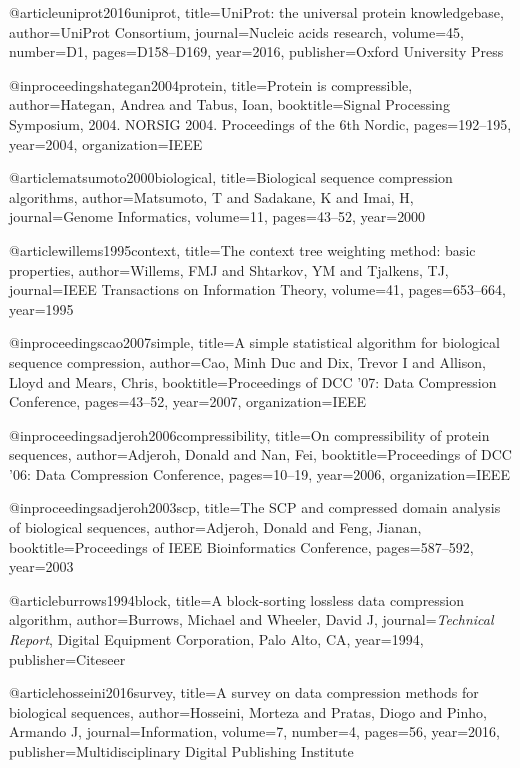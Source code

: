 @article{uniprot2016uniprot,
  title={{UniProt}: the universal protein knowledgebase},
  author={UniProt Consortium},
  journal={Nucleic acids research},
  volume={45},
  number={D1},
  pages={D158--D169},
  year={2016},
  publisher={Oxford University Press}
}

@inproceedings{hategan2004protein,
  title={Protein is compressible},
  author={Hategan, Andrea and Tabus, Ioan},
  booktitle={Signal Processing Symposium, 2004. NORSIG 2004. Proceedings of the 6th Nordic},
  pages={192--195},
  year={2004},
  organization={IEEE}
}

@article{matsumoto2000biological,
  title={Biological sequence compression algorithms},
  author={Matsumoto, T and Sadakane, K and Imai, H},
  journal={Genome Informatics},
  volume={11},
  pages={43--52},
  year={2000}
}

@article{willems1995context,
  title={The context tree weighting method: basic properties},
  author={Willems, FMJ and Shtarkov, YM and Tjalkens, TJ},
  journal={IEEE Transactions on Information Theory},
  volume={41},
  pages={653--664},
  year={1995}
}

@inproceedings{cao2007simple,
  title={A simple statistical algorithm for biological sequence compression},
  author={Cao, Minh Duc and Dix, Trevor I and Allison, Lloyd and Mears, Chris},
  booktitle={Proceedings of DCC '07: Data Compression Conference},
  pages={43--52},
  year={2007},
  organization={IEEE}
}

@inproceedings{adjeroh2006compressibility,
  title={On compressibility of protein sequences},
  author={Adjeroh, Donald and Nan, Fei},
  booktitle={Proceedings of DCC '06: Data Compression Conference},
  pages={10--19},
  year={2006},
  organization={IEEE}
}

@inproceedings{adjeroh2003scp,
  title={The {SCP} and compressed domain analysis of biological sequences},
  author={Adjeroh, Donald and Feng, Jianan},
  booktitle={Proceedings of IEEE Bioinformatics Conference},
  pages={587--592},
  year={2003}
}

@article{burrows1994block,
  title={A block-sorting lossless data compression algorithm},
  author={Burrows, Michael and Wheeler, David J},
  journal={\textit{Technical Report}, Digital Equipment Corporation, Palo Alto, CA},
  year={1994},
  publisher={Citeseer}
}

@article{hosseini2016survey,
  title={A survey on data compression methods for biological sequences},
  author={Hosseini, Morteza and Pratas, Diogo and Pinho, Armando J},
  journal={Information},
  volume={7},
  number={4},
  pages={56},
  year={2016},
  publisher={Multidisciplinary Digital Publishing Institute}
}

